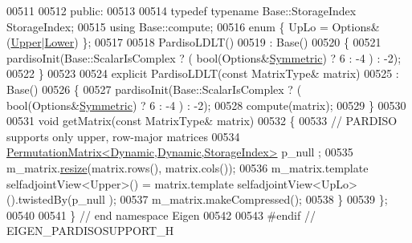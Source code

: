\begin{DoxyCode}
00511 
00512   \textcolor{keyword}{public}:
00513 
00514     \textcolor{keyword}{typedef} \textcolor{keyword}{typename} Base::StorageIndex StorageIndex;
00515     \textcolor{keyword}{using} Base::compute;
00516     \textcolor{keyword}{enum} \{ UpLo = Options&(\hyperlink{group__enums_gga39e3366ff5554d731e7dc8bb642f83cda6bcb58be3b8b8ec84859ce0c5ac0aaec}{Upper}|\hyperlink{group__enums_gga39e3366ff5554d731e7dc8bb642f83cda891792b8ed394f7607ab16dd716f60e6}{Lower}) \};
00517 
00518     PardisoLDLT()
00519       : Base()
00520     \{
00521       pardisoInit(Base::ScalarIsComplex ? ( \textcolor{keywordtype}{bool}(Options&\hyperlink{group__enums_gga39e3366ff5554d731e7dc8bb642f83cda7d30fb969ef6b763c098f0015108cef4}{Symmetric}) ? 6 : -4 ) : -2);
00522     \}
00523 
00524     \textcolor{keyword}{explicit} PardisoLDLT(\textcolor{keyword}{const} MatrixType& matrix)
00525       : Base()
00526     \{
00527       pardisoInit(Base::ScalarIsComplex ? ( \textcolor{keywordtype}{bool}(Options&\hyperlink{group__enums_gga39e3366ff5554d731e7dc8bb642f83cda7d30fb969ef6b763c098f0015108cef4}{Symmetric}) ? 6 : -4 ) : -2);
00528       compute(matrix);
00529     \}
00530     
00531     \textcolor{keywordtype}{void} getMatrix(\textcolor{keyword}{const} MatrixType& matrix)
00532     \{
00533       \textcolor{comment}{// PARDISO supports only upper, row-major matrices}
00534       \hyperlink{group___core___module}{PermutationMatrix<Dynamic,Dynamic,StorageIndex>} p\_null
      ;
00535       m\_matrix.\hyperlink{group___core___module_a0e0fda6e84d69e02432e4770359bb532}{resize}(matrix.rows(), matrix.cols());
00536       m\_matrix.template selfadjointView<Upper>() = matrix.template selfadjointView<UpLo>().twistedBy(p\_null
      );
00537       m\_matrix.makeCompressed();
00538     \}
00539 \};
00540 
00541 \} \textcolor{comment}{// end namespace Eigen}
00542 
00543 \textcolor{preprocessor}{#endif // EIGEN\_PARDISOSUPPORT\_H}
\end{DoxyCode}
